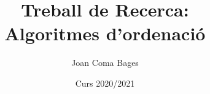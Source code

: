 \documentclass[a4paper,12pt]{report}
\begin{document}
	\title{Treball de Recerca: \\ Algoritmes d'ordenació}
	\author{Joan Coma Bages}
	\date{Curs 2020/2021}

	\maketitle
	\tableofcontents
	
	
	
	
	
	
	
	
	
	
\end{document}
